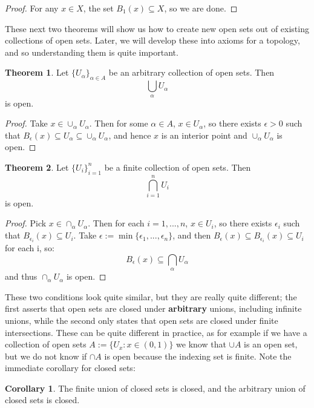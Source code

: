 \documentclass[11pt, oneside]{amsart}   	%
\theoremstyle{definition}
\newtheorem{theorem}{Theorem}[section]
\newtheorem{corollary}{Corollary}[theorem]
\begin{document}
	\begin{proof} 
		For any $x\in X$, the set $B_1(x)\subseteq X$, so we are done.
	\end{proof}
	
	These next two theorems will show us how to create new open sets out of existing collections of open sets. Later, we will develop these into axioms for 
	a topology, and so understanding them is quite important.
	
	\begin{theorem}
		Let $\{U_\alpha\}_{\alpha\in A}$ be an arbitrary collection of open sets. Then
		$$
			\bigcup_\alpha U_\alpha
		$$
		is open.
	\end{theorem}
	
	\begin{proof}
		Take $x\in \cup_\alpha U_\alpha$. Then for some $\alpha\in A$, $x\in U_\alpha$, so there exists $\epsilon > 0$ such that $B_\epsilon(x)\subseteq 
		U_\alpha\subseteq \cup_\alpha U_\alpha$, and hence $x$ is an interior point and $\cup_\alpha U_\alpha$ is open.
	\end{proof}
	
	\begin{theorem}
		Let $\{U_i\}_{i = 1}^n$ be a finite collection of open sets. Then 
		$$
			\bigcap_{i = 1}^n U_i
		$$
		is open.
	\end{theorem}
	
	\begin{proof}
		Pick $x\in\cap_\alpha U_\alpha$. Then for each $i = 1, ..., n$, $x\in U_i$, so there exists $\epsilon_i$ such that $B_{\epsilon_i}(x)\subseteq U_i$. Take 
		$\epsilon := \min \{\epsilon_1, ..., \epsilon_n\}$, and then $B_\epsilon(x)\subseteq B_{\epsilon_i}(x)\subseteq U_i$ for each i, so:
		$$
			B_\epsilon(x)\subseteq \bigcap_\alpha U_\alpha
		$$
		and thus $\cap_\alpha U_\alpha$ is open.
	\end{proof}
	
	These two conditions look quite similar, but they are really quite different; the first asserts that open sets are closed under \textbf{arbitrary} unions, including 
	infinite unions, while the second only states that open sets are closed under finite intersections. These can be quite different in practice, as for example if 
	we have a collection of open sets $A := \{U_x : x\in (0, 1)\}$ we know that $\cup A$ is an open set, but we do not know if $\cap A$ is open because the 
	indexing set is finite. Note the immediate corollary for closed sets:
	
	\begin{corollary}
		The finite union of closed sets is closed, and the arbitrary union of closed sets is closed.
	\end{corollary}
	
\end{document}
